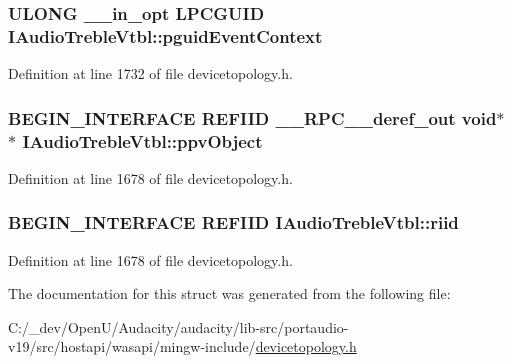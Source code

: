 \subsubsection[{\texorpdfstring{pguid\+Event\+Context}{pguidEventContext}}]{ {\bf U\+L\+O\+NG} {\bf \+\_\+\+\_\+in\+\_\+opt} {\bf L\+P\+C\+G\+U\+ID} I\+Audio\+Treble\+Vtbl\+::pguid\+Event\+Context}\hypertarget{struct_i_audio_treble_vtbl_ac5d8c684967296181fe18258609dacb2}{}\label{struct_i_audio_treble_vtbl_ac5d8c684967296181fe18258609dacb2}


Definition at line 1732 of file devicetopology.\+h.

\subsubsection[{\texorpdfstring{ppv\+Object}{ppvObject}}]{\setlength{\rightskip}{0pt plus 5cm}B\+E\+G\+I\+N\+\_\+\+I\+N\+T\+E\+R\+F\+A\+CE {\bf R\+E\+F\+I\+ID} {\bf \+\_\+\+\_\+\+R\+P\+C\+\_\+\+\_\+deref\+\_\+out} {\bf void}$\ast$$\ast$ I\+Audio\+Treble\+Vtbl\+::ppv\+Object}\hypertarget{struct_i_audio_treble_vtbl_a8d537881b3d6b4122fc414380892ea56}{}\label{struct_i_audio_treble_vtbl_a8d537881b3d6b4122fc414380892ea56}


Definition at line 1678 of file devicetopology.\+h.

\subsubsection[{\texorpdfstring{riid}{riid}}]{\setlength{\rightskip}{0pt plus 5cm}B\+E\+G\+I\+N\+\_\+\+I\+N\+T\+E\+R\+F\+A\+CE {\bf R\+E\+F\+I\+ID} I\+Audio\+Treble\+Vtbl\+::riid}\hypertarget{struct_i_audio_treble_vtbl_ac2128c721c2366557ee7435436debb9b}{}\label{struct_i_audio_treble_vtbl_ac2128c721c2366557ee7435436debb9b}


Definition at line 1678 of file devicetopology.\+h.



The documentation for this struct was generated from the following file\+:\begin{DoxyCompactItemize}
\item 
C\+:/\+\_\+dev/\+Open\+U/\+Audacity/audacity/lib-\/src/portaudio-\/v19/src/hostapi/wasapi/mingw-\/include/\hyperlink{devicetopology_8h}{devicetopology.\+h}\end{DoxyCompactItemize}
